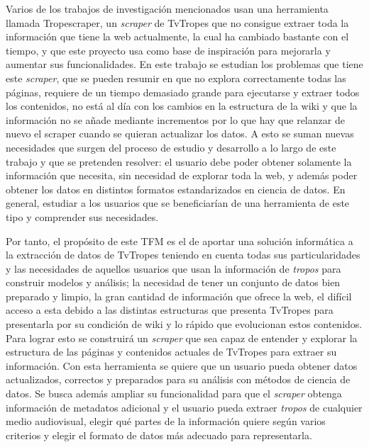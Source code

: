 Varios de los trabajos de investigación mencionados usan una herramienta llamada
Tropescraper, un \textit{scraper} de TvTropes que no consigue extraer toda la
información que tiene la web actualmente, la cual ha cambiado bastante con el
tiempo, y que este proyecto usa como base de inspiración para mejorarla y
aumentar sus funcionalidades. En este trabajo se estudian los problemas que
tiene este \textit{scraper}, que se pueden resumir en que no explora
correctamente todas las páginas, requiere de un tiempo demasiado grande para
ejecutarse y extraer todos los contenidos, no está al día con los cambios en la
estructura de la wiki y que la información no se añade mediante incrementos por
lo que hay que relanzar de nuevo el scraper cuando se quieran actualizar los
datos. A esto se suman nuevas necesidades que surgen del proceso de estudio y
desarrollo a lo largo de este trabajo y que se pretenden resolver: el usuario
debe poder obtener solamente la información que necesita, sin necesidad de
explorar toda la web, y además poder obtener los datos en distintos formatos
estandarizados en ciencia de datos. En general, estudiar a los usuarios que se
beneficiarían de una herramienta de este tipo y comprender sus necesidades.

Por tanto, el propósito de este TFM es el de aportar una solución informática a
la extracción de datos de TvTropes teniendo en cuenta todas sus particularidades
y las necesidades de aquellos usuarios que usan la información de
\textit{tropos} para construir modelos y análisis; la necesidad de tener un
conjunto de datos bien preparado y limpio, la gran cantidad de información que
ofrece la web, el difícil acceso a esta debido a las distintas estructuras que
presenta TvTropes para presentarla por su condición de wiki y lo rápido que
evolucionan estos contenidos. Para lograr esto se construirá un \textit{scraper}
que sea capaz de entender y explorar la estructura de las páginas y contenidos
actuales de TvTropes para extraer su información. Con esta herramienta se quiere
que un usuario pueda obtener datos actualizados, correctos y preparados para su
análisis con métodos de ciencia de datos. Se busca además ampliar su
funcionalidad para que el \textit{scraper} obtenga información de metadatos
adicional y el usuario pueda extraer \textit{tropos} de cualquier medio
audiovisual, elegir qué partes de la información quiere según varios criterios y
elegir el formato de datos más adecuado para representarla.

